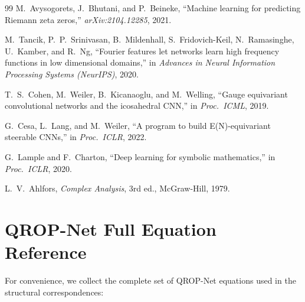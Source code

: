 \documentclass[11pt, a4paper]{article}
\theoremstyle{definition}
\theoremstyle{plain}
\begin{document}
\begin{thebibliography}{99}
M.~Avysogorets, J.~Bhutani, and P.~Beineke,
``Machine learning for predicting Riemann zeta zeros,''
\textit{arXiv:2104.12285}, 2021.

M.~Tancik, P.~P.~Srinivasan, B.~Mildenhall, S.~Fridovich-Keil,
N.~Ramasinghe, U.~Kamber, and R.~Ng,
``Fourier features let networks learn high frequency functions in low
dimensional domains,''
in \textit{Advances in Neural Information Processing Systems (NeurIPS)},
2020.

T.~S.~Cohen, M.~Weiler, B.~Kicanaoglu, and M.~Welling,
``Gauge equivariant convolutional networks and the icosahedral CNN,''
in \textit{Proc.\ ICML}, 2019.

G.~Cesa, L.~Lang, and M.~Weiler,
``A program to build E(N)-equivariant steerable CNNs,''
in \textit{Proc.\ ICLR}, 2022.

G.~Lample and F.~Charton,
``Deep learning for symbolic mathematics,''
in \textit{Proc.\ ICLR}, 2020.

L.~V.~Ahlfors,
\textit{Complex Analysis},
3rd ed., McGraw-Hill, 1979.

\end{thebibliography}


\appendix

\section{QROP-Net Full Equation Reference}
\label{app:qropnet_eqs}

For convenience, we collect the complete set of QROP-Net equations used
in the structural correspondences:
\end{document}

